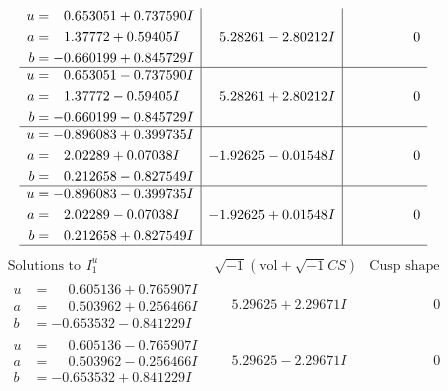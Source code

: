 \documentclass[1p]{elsarticle_modified}
\theoremstyle{definition}
\newcommand{\I}{\sqrt{-1}}
\begin{document}
$$\begin{array}{c|c|c}
\begin{aligned}
u &= \phantom{-}0.653051 + 0.737590 I \\
a &= \phantom{-}1.37772 + 0.59405 I \\
b &= -0.660199 + 0.845729 I\end{aligned}
 & \phantom{-}5.28261 - 2.80212 I & \phantom{-0.000000 } 0 \\ \hline\begin{aligned}
u &= \phantom{-}0.653051 - 0.737590 I \\
a &= \phantom{-}1.37772 - 0.59405 I \\
b &= -0.660199 - 0.845729 I\end{aligned}
 & \phantom{-}5.28261 + 2.80212 I & \phantom{-0.000000 } 0 \\ \hline\begin{aligned}
u &= -0.896083 + 0.399735 I \\
a &= \phantom{-}2.02289 + 0.07038 I \\
b &= \phantom{-}0.212658 - 0.827549 I\end{aligned}
 & -1.92625 - 0.01548 I & \phantom{-0.000000 } 0 \\ \hline\begin{aligned}
u &= -0.896083 - 0.399735 I \\
a &= \phantom{-}2.02289 - 0.07038 I \\
b &= \phantom{-}0.212658 + 0.827549 I\end{aligned}
 & -1.92625 + 0.01548 I & \phantom{-0.000000 } 0\\
 \hline 
 \end{array}$$\newpage$$\begin{array}{c|c|c}  
\text{Solutions to }I^u_{1}& \I (\text{vol} + \sqrt{-1}CS) & \text{Cusp shape}\\
 \hline 
\begin{aligned}
u &= \phantom{-}0.605136 + 0.765907 I \\
a &= \phantom{-}0.503962 + 0.256466 I \\
b &= -0.653532 - 0.841229 I\end{aligned}
 & \phantom{-}5.29625 + 2.29671 I & \phantom{-0.000000 } 0 \\ \hline\begin{aligned}
u &= \phantom{-}0.605136 - 0.765907 I \\
a &= \phantom{-}0.503962 - 0.256466 I \\
b &= -0.653532 + 0.841229 I\end{aligned}
 & \phantom{-}5.29625 - 2.29671 I & \phantom{-0.000000 } 0 \\ \hline\begin{aligned}

\end{aligned}
\end{array}$$
\end{document}
